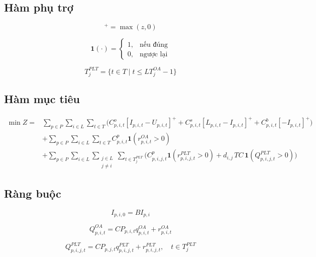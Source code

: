 \documentclass[12pt]{article}
\begin{document}
\subsection{Hàm phụ trợ}

\begin{equation}
[z]^+ = \max(z,0)
\end{equation}

\begin{equation}
\mathbf{1}(\cdot)=
\begin{cases}
1, & \text{nếu đúng}\\
0, & \text{ngược lại}
\end{cases}
\end{equation}

\begin{equation}
T_j^{PLT} = \{t \in T \mid t \le LT_j^{OA} - 1\}
\end{equation}

\subsection{Hàm mục tiêu}

\begin{align}
\min Z
=& \sum_{p \in P} \sum_{i \in L} \sum_{t \in T}
\Big(
C^o_{p,i,t} [I_{p,i,t} - U_{p,i,t}]^+
+ C^s_{p,i,t} [L_{p,i,t} - I_{p,i,t}]^+
+ C^b_{p,i,t} [-I_{p,i,t}]^+
\Big) \\
&+ \sum_{p \in P} \sum_{i \in L} \sum_{t \in T}
C^p_{p,i,t} \mathbf{1}(r^{OA}_{p,i,t} > 0) \\
&+ \sum_{p \in P} \sum_{i \in L} \sum_{\substack{j \in L \\ j \neq i}} \sum_{t \in T_j^{PLT}}
\Big(
C^p_{p,i,j,t} \mathbf{1}(r^{PLT}_{p,i,j,t} > 0)
+ d_{i,j} \, TC \, \mathbf{1}(Q^{PLT}_{p,i,j,t} > 0)
\Big)
\end{align}

\subsection{Ràng buộc}

\begin{equation}
I_{p,i,0} = BI_{p,i}
\end{equation}

\begin{equation}
Q^{OA}_{p,i,t} = CP_{p,i,t} q^{OA}_{p,i,t} + r^{OA}_{p,i,t}
\end{equation}

\begin{equation}
Q^{PLT}_{p,i,j,t} = CP_{p,j,t} q^{PLT}_{p,i,j,t} + r^{PLT}_{p,i,j,t}, \quad t \in T_j^{PLT}
\end{equation}
\end{document}
